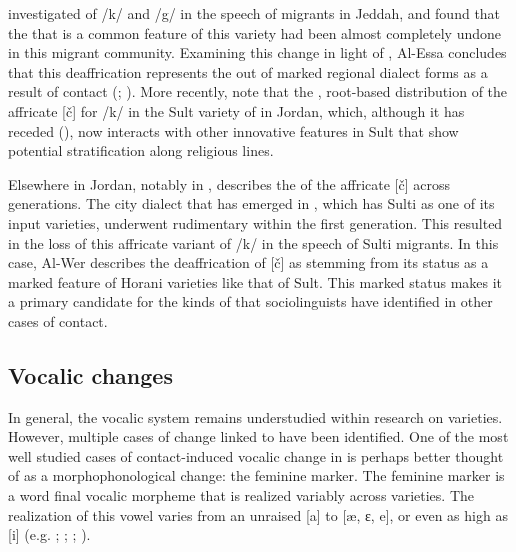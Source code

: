 \documentclass[output=paper]{langsci/langscibook}
\begin{document}
  \citet{Al-Essa2008} investigated  of /k/ and /g/ in the speech of   migrants in Jeddah, and found that the  that is a common feature of this variety had been almost completely undone in this migrant community. Examining this change in light of , Al-Essa concludes that this deaffrication represents the  out of marked regional dialect forms as a result of contact (\citealt{Trudgill1986}; \citealt{KerswillWilliams2000}). More recently, \citet{Al-WerEtAl2015} note that the , root-based distribution of the affricate [č] for /k/ in the Sult variety of  in Jordan, which, although it has receded (\citealt{Al-Wer1991}), now interacts with other innovative features in Sult that show potential stratification along religious lines. 

  Elsewhere in Jordan, notably in , \citet{Al-Wer2007} describes the  of the affricate [č] across generations. The city dialect that has emerged in , which has Sulti  as one of its input varieties, underwent rudimentary  \citep{Trudgill2004} within the first generation. This  resulted in the loss of this affricate variant of /k/ in the speech of Sulti migrants. In this case, Al-Wer describes the deaffrication of [č] as stemming from its status as a marked feature of Horani  varieties like that of Sult. This marked status makes it a primary candidate for the kinds of  that sociolinguists have identified in other cases of contact. 


 
 \subsection{Vocalic changes}


In general, the  vocalic system remains understudied within research on  varieties. However, multiple cases of change linked to  have been identified. One of the most well studied cases of contact-induced vocalic change in  is perhaps better thought of as a morphophonological change: the  feminine  marker. The feminine  marker is a word final vocalic morpheme that is realized variably across  varieties. The realization of this vowel varies from an unraised [a] to [æ, ɛ, e], or even as high as [i] (e.g. \citealt{Al-Wer2007}; \citealt{Naïm2011}; \citealt{Shahin2011}; \citealt{Woidich2011}). 
\end{document}
